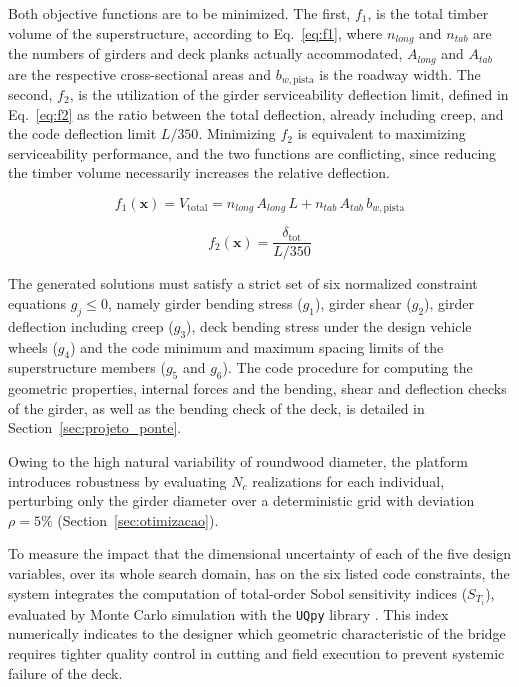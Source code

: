Both objective functions are to be minimized.
The first, $f_1$, is the total timber volume of the superstructure, according to Eq.~\eqref{eq:f1}, where $n_{long}$ and $n_{tab}$ are the numbers of girders and deck planks actually accommodated, $A_{long}$ and $A_{tab}$ are the respective cross-sectional areas and $b_{w,\mathrm{pista}}$ is the roadway width.
The second, $f_2$, is the utilization of the girder serviceability deflection limit, defined in Eq.~\eqref{eq:f2} as the ratio between the total deflection, already including creep, and the code deflection limit $L/350$.
Minimizing $f_2$ is equivalent to maximizing serviceability performance, and the two functions are conflicting, since reducing the timber volume necessarily increases the relative deflection.

\begin{equation}
f_1(\mathbf{x}) = V_{\mathrm{total}} = n_{long}\,A_{long}\,L + n_{tab}\,A_{tab}\,b_{w,\mathrm{pista}}
\label{eq:f1}
\end{equation}

\begin{equation}
f_2(\mathbf{x}) = \frac{\delta_{\mathrm{tot}}}{L/350}
\label{eq:f2}
\end{equation}

The generated solutions must satisfy a strict set of six normalized constraint equations $g_j \leq 0$, namely girder bending stress ($g_1$), girder shear ($g_2$), girder deflection including creep ($g_3$), deck bending stress under the design vehicle wheels ($g_4$) and the code minimum and maximum spacing limits of the superstructure members ($g_5$ and $g_6$).
The code procedure for computing the geometric properties, internal forces and the bending, shear and deflection checks of the girder, as well as the bending check of the deck, is detailed in Section~\ref{sec:projeto_ponte}.

Owing to the high natural variability of roundwood diameter, the platform introduces robustness by evaluating $N_c$ realizations for each individual, perturbing only the girder diameter over a deterministic grid with deviation $\rho = 5\%$ (Section~\ref{sec:otimizacao}).

To measure the impact that the dimensional uncertainty of each of the five design variables, over its whole search domain, has on the six listed code constraints, the system integrates the computation of total-order Sobol sensitivity indices ($S_{T_i}$), evaluated by Monte Carlo simulation with the \texttt{UQpy} library \parencite{Olivier2020}.
This index numerically indicates to the designer which geometric characteristic of the bridge requires tighter quality control in cutting and field execution to prevent systemic failure of the deck.
